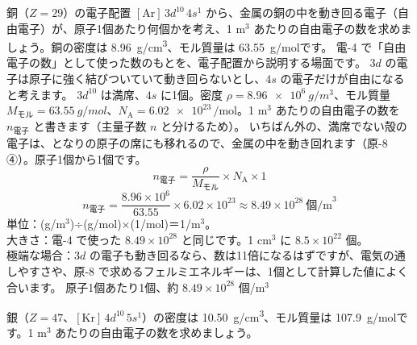 \label{ph:原-7:ex8}
\begin{phreidai}
銅（$Z=29$）の電子配置 $[\mathrm{Ar}]\,3d^{10}\,4s^1$ から、金属の銅の中を動き回る電子（自由電子）が、原子1個あたり何個かを考え、1 m$^3$ あたりの自由電子の数を求めましょう。銅の密度は \qty{8.96}{g/cm^3}、モル質量は \qty{63.55}{g/mol}です。
\phbamen
電-4 で「自由電子の数」として使った数のもとを、電子配置から説明する場面です。
\phmushi
$3d$ の電子は原子に強く結びついていて動き回らないとし、$4s$ の電子だけが自由になると考えます。
\phzu
$3d^{10}$ は満席、$4s$ に1個。密度 $\rho=\qty{8.96e6}{g/m^3}$、モル質量 $M_{\text{モル}}=\qty{63.55}{g/mol}$、$N_{\mathrm A}=\num{6.02e23}\,\mathrm{/mol}$。1 m$^3$ あたりの自由電子の数を $n_{\text{電子}}$ と書きます（主量子数 $n$ と分けるため）。
\phriyu
いちばん外の、満席でない殻の電子は、となりの原子の席にも移れるので、金属の中を動き回れます（原-8 ④）。原子1個から1個です。
\phtateru
\[ n_{\text{電子}}=\frac{\rho}{M_{\text{モル}}}\times N_{\mathrm A}\times1 \]
\phtoku
\[ n_{\text{電子}}=\frac{8.96\times10^6}{63.55}\times6.02\times10^{23}\approx8.49\times10^{28}\ \text{個/m}^3 \]
\phtashikame
単位：(g/m$^3$)÷(g/mol)×(1/mol)＝1/m$^3$。\\
大きさ：電-4 で使った $8.49\times10^{28}$ と同じです。1 cm$^3$ に $8.5\times10^{22}$ 個。\\
極端な場合：$3d$ の電子も動き回るなら、数は11倍になるはずですが、電気の通しやすさや、原-8 で求めるフェルミエネルギーは、1個として計算した値によく合います。
\kotae 原子1個あたり1個、約 $8.49\times10^{28}$ 個/m$^3$
\end{phreidai}
\begin{jibun}
銀（$Z=47$、$[\mathrm{Kr}]\,4d^{10}\,5s^1$）の密度は \qty{10.50}{g/cm^3}、モル質量は \qty{107.9}{g/mol}です。1 m$^3$ あたりの自由電子の数を求めましょう。
\end{jibun}

